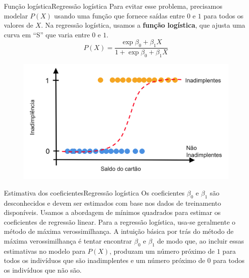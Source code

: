 \documentclass[t]{beamer}
\begin{document}
\begin{ftst}{Função logística}{Regressão logística}
\small
Para evitar esse problema, precisamos modelar $P(X)$ usando uma função que fornece saídas entre $0$ e $1$ para todos os valores de $X$. 
\vone
Na regressão logística, usamos a \textbf{função logística}, que ajusta uma curva em “S” que varia entre $0$ e $1$.
\begin{equation}
    P(X) = \frac{\exp{\beta_0 + \beta_1 X}}{1 + \exp{\beta_0 + \beta_1 X}}
\end{equation}

\begin{figure}
    \centering
    \includegraphics[scale=0.12]{Figuras/slide05_07.png}
\end{figure}


\end{ftst}


\begin{ftst}{Estimativa dos coeficientes}{Regressão logística}
Os coeficientes $\beta_0$ e $\beta_1$ são desconhecidos e devem ser estimados com base nos dados de treinamento disponíveis. 
\vone
Usamos a abordagem de mínimos quadrados para estimar os coeficientes de regressão linear. Para a regressão logística, usa-se geralmente o método de máxima verossimilhança.
\vone
A intuição básica por trás do método de máxima verossimilhança é tentar encontrar $\beta_0$ e $\beta_1$ de modo que, ao incluir essas estimativas no modelo para $P(X)$, produzam um número próximo de $1$ para todos os indivíduos que são inadimplentes e um número próximo de $0$ para todos os indivíduos que não são.

\end{ftst}

\end{document}
